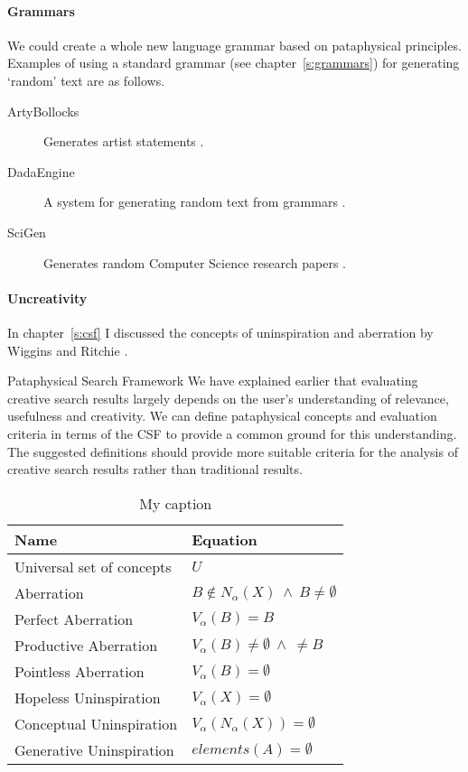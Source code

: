 \documentclass[11pt]{thesis} %
\begin{document}
\paragraph{Grammars}
We could create a whole new language grammar based on pataphysical principles. Examples of using a standard grammar (see chapter~\ref{s:grammars}) for generating `random' text are as follows.

\begin{description}
  \item[ArtyBollocks] Generates artist statements \autocite{Winter2016}.
  \item[DadaEngine] A system for generating random text from grammars \autocite{Dada2016}.
  \item[SciGen] Generates random Computer Science research papers \autocite{Stribling2016}.
\end{description}

\paragraph{Uncreativity}
In chapter~\ref{s:csf} I discussed the concepts of uninspiration and aberration by Wiggins and Ritchie \citeyear{Wiggins2006,Ritchie2012}. 

Pataphysical Search Framework
We have explained earlier that evaluating creative search results largely depends on the user's understanding of relevance, usefulness and creativity. We can define pataphysical concepts and evaluation criteria in terms of the \ac{CSF} to provide a common ground for this understanding. The suggested definitions should provide more suitable criteria for the analysis of creative search results rather than traditional results.


\begin{table}[]
\centering
\caption{My caption}
\label{my-label}
\begin{tabu}{XX}
\toprule
\textbf{Name}&\textbf{Equation} \\
\midrule
Universal set of concepts & $U$ \\
Aberration & $B \notin N_\alpha (X) \ \wedge \ B \neq \emptyset$ \\
Perfect Aberration & $V_\alpha (B) = B$ \\
Productive Aberration & $V_\alpha(B) \neq \emptyset \ \wedge \ \neq B$ \\
Pointless Aberration & $V_\alpha(B) = \emptyset$ \\
Hopeless Uninspiration & $V_\alpha (X) = \emptyset$ \\
Conceptual Uninspiration  & $V_\alpha (N_\alpha (X)) = \emptyset$ \\
Generative Uninspiration  & $elements(A) = \emptyset$ \\
\bottomrule
\end{tabu}
\end{table}
\end{document}
